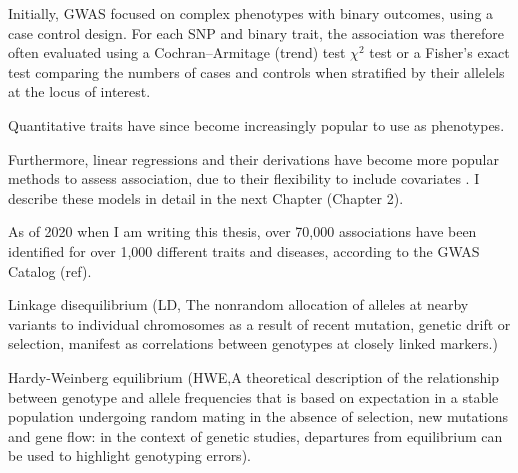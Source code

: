 Initially, GWAS focused on complex phenotypes with binary outcomes, using a case control design. 
For each SNP and binary trait, the association was therefore often evaluated using a Cochran–Armitage (trend) test
$\chi^2$ test or a Fisher's exact test comparing the numbers of cases and controls when stratified by their allelels at the locus of interest.

Quantitative traits have since become increasingly popular to use as phenotypes. 

Furthermore, linear regressions and their derivations have become more popular methods to assess association, due to their flexibility to include covariates \cite{mccarthy2008genome}.
I describe these models in detail in the next Chapter (Chapter 2). 

As of 2020 when I am writing this thesis, over 70,000 associations have been identified for over 1,000 different traits and diseases, according to the GWAS Catalog (ref).

Linkage disequilibrium (LD, The nonrandom allocation of alleles at nearby variants to individual chromosomes as a result of recent mutation, genetic drift or selection, manifest as correlations between genotypes at closely linked markers.)

Hardy-Weinberg equilibrium (HWE,A theoretical description of the relationship between genotype and allele frequencies that is based on expectation in a stable population undergoing random mating in the absence of selection, new mutations and gene flow: in the context of genetic studies, departures from equilibrium can be used to highlight genotyping errors).

